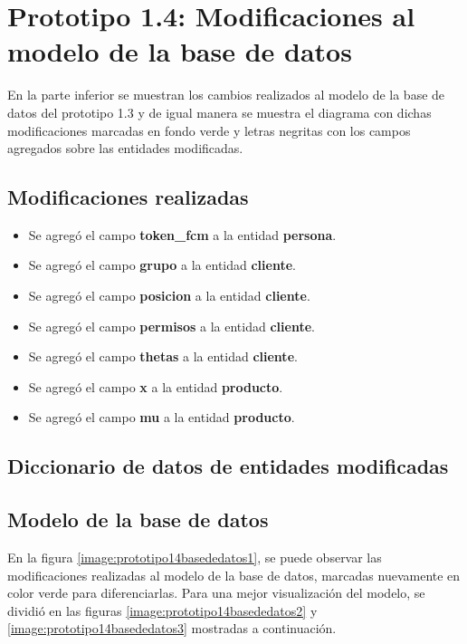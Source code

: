 \section{Prototipo 1.4: Modificaciones al modelo de la base de datos}
En la parte inferior se muestran los cambios realizados al modelo de la base de datos del prototipo 1.3 y de igual manera se muestra el diagrama con dichas modificaciones marcadas en fondo verde y letras negritas con los campos agregados sobre las entidades modificadas.

\subsection{Modificaciones realizadas}
\begin{itemize}
\item Se agregó el campo \textbf{token\_fcm} a la entidad \textbf{persona}.
\item Se agregó el campo \textbf{grupo} a la entidad \textbf{cliente}.
\item Se agregó el campo \textbf{posicion} a la entidad \textbf{cliente}.
\item Se agregó el campo \textbf{permisos} a la entidad \textbf{cliente}.
\item Se agregó el campo \textbf{thetas} a la entidad \textbf{cliente}.
\item Se agregó el campo \textbf{x} a la entidad \textbf{producto}.
\item Se agregó el campo \textbf{mu} a la entidad \textbf{producto}.
\end{itemize}

\subsection{Diccionario de datos de entidades modificadas}


\subsection{Modelo de la base de datos}
En la figura \ref{image:prototipo14basededatos1}, se puede observar las modificaciones realizadas al modelo de la base de datos, marcadas nuevamente en color verde para diferenciarlas. Para una mejor visualización del modelo, se dividió en las figuras \ref{image:prototipo14basededatos2} y \ref{image:prototipo14basededatos3} mostradas a continuación.


